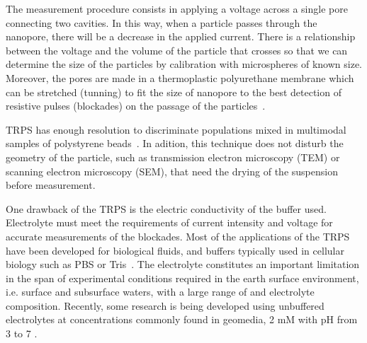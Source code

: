 \documentclass[journal=langd5,manuscript=article]{achemso}
\begin{document}

The measurement procedure consists in applying a voltage across a single pore connecting two cavities. In this way, when a particle passes through the nanopore, there will be a decrease in the applied current. There is a relationship between the voltage and the volume of the particle that crosses so that we can determine the size of the particles by calibration with microspheres of known size. Moreover, the pores are made in a  thermoplastic polyurethane membrane which can be stretched (tunning) to fit the size of nanopore to the best detection of  resistive pulses (blockades) on the passage of the particles~\cite{Weatherall2016}.



TRPS has enough resolution to discriminate populations mixed in multimodal samples of polystyrene beads~\cite{Varenne2016MultimodalMethods}.  In adition, this technique does not disturb the geometry of the particle, such as  transmission electron microscopy (TEM) or scanning electron microscopy (SEM), that need the drying of the suspension before measurement.

One drawback of the TRPS is the electric conductivity of the buffer used. Electrolyte must meet the requirements of current intensity and voltage for accurate measurements of the blockades. Most of the applications of the TRPS have been developed for biological fluids, and buffers typically used in cellular biology  such as PBS or Tris~\cite{Lane2015}.
The electrolyte constitutes an important limitation in the span of  experimental conditions required in the  earth surface environment, i.e. surface and subsurface waters, with a large range of  and electrolyte composition. Recently, some research is being developed using unbuffered electrolytes at concentrations commonly found in geomedia, 2 mM  with   pH from  3 to 7 \cite{Mayne2016} .
\end{document}

